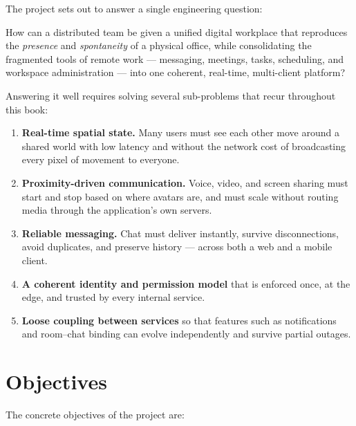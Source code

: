 The project sets out to answer a single engineering question:

\begin{infobox}[title=Problem Statement]
How can a distributed team be given a unified digital workplace that reproduces
the \emph{presence} and \emph{spontaneity} of a physical office, while
consolidating the fragmented tools of remote work --- messaging, meetings,
tasks, scheduling, and workspace administration --- into one coherent,
real-time, multi-client platform?
\end{infobox}

Answering it well requires solving several sub-problems that recur throughout
this book:

\begin{enumerate}
  \item \textbf{Real-time spatial state.} Many users must see each other move
  around a shared world with low latency and without the network cost of
  broadcasting every pixel of movement to everyone.

  \item \textbf{Proximity-driven communication.} Voice, video, and screen
  sharing must start and stop based on where avatars are, and must scale without
  routing media through the application's own servers.

  \item \textbf{Reliable messaging.} Chat must deliver instantly, survive
  disconnections, avoid duplicates, and preserve history --- across both a web
  and a mobile client.

  \item \textbf{A coherent identity and permission model} that is enforced once,
  at the edge, and trusted by every internal service.

  \item \textbf{Loose coupling between services} so that features such as
  notifications and room--chat binding can evolve independently and survive
  partial outages.
\end{enumerate}

\section{Objectives}

The concrete objectives of the \voname{} project are:

